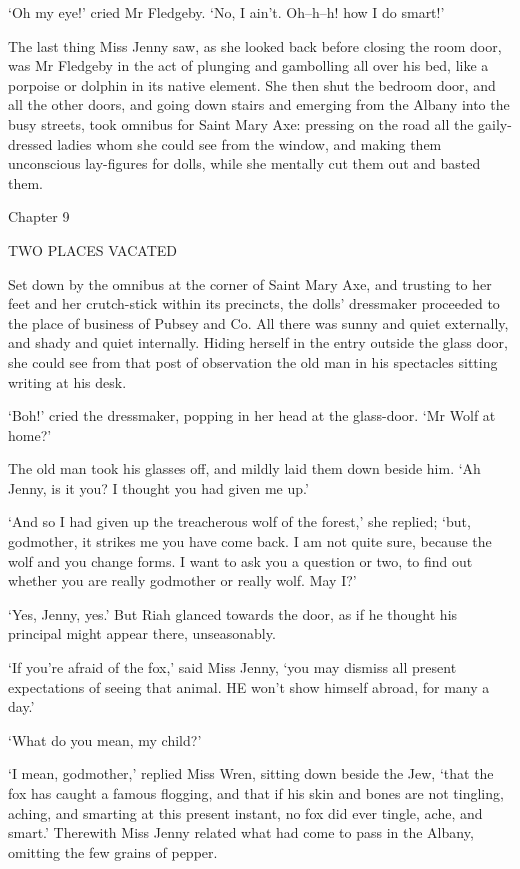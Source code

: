 ‘Oh my eye!’ cried Mr Fledgeby. ‘No, I ain’t. Oh--h--h! how I do smart!’

The last thing Miss Jenny saw, as she looked back before closing the
room door, was Mr Fledgeby in the act of plunging and gambolling all
over his bed, like a porpoise or dolphin in its native element. She then
shut the bedroom door, and all the other doors, and going down stairs
and emerging from the Albany into the busy streets, took omnibus for
Saint Mary Axe: pressing on the road all the gaily-dressed ladies whom
she could see from the window, and making them unconscious lay-figures
for dolls, while she mentally cut them out and basted them.



Chapter 9

TWO PLACES VACATED


Set down by the omnibus at the corner of Saint Mary Axe, and trusting
to her feet and her crutch-stick within its precincts, the dolls’
dressmaker proceeded to the place of business of Pubsey and Co. All
there was sunny and quiet externally, and shady and quiet internally.
Hiding herself in the entry outside the glass door, she could see from
that post of observation the old man in his spectacles sitting writing
at his desk.

‘Boh!’ cried the dressmaker, popping in her head at the glass-door. ‘Mr
Wolf at home?’

The old man took his glasses off, and mildly laid them down beside him.
‘Ah Jenny, is it you? I thought you had given me up.’

‘And so I had given up the treacherous wolf of the forest,’ she replied;
‘but, godmother, it strikes me you have come back. I am not quite sure,
because the wolf and you change forms. I want to ask you a question or
two, to find out whether you are really godmother or really wolf. May
I?’

‘Yes, Jenny, yes.’ But Riah glanced towards the door, as if he thought
his principal might appear there, unseasonably.

‘If you’re afraid of the fox,’ said Miss Jenny, ‘you may dismiss all
present expectations of seeing that animal. HE won’t show himself
abroad, for many a day.’

‘What do you mean, my child?’

‘I mean, godmother,’ replied Miss Wren, sitting down beside the Jew,
‘that the fox has caught a famous flogging, and that if his skin and
bones are not tingling, aching, and smarting at this present instant, no
fox did ever tingle, ache, and smart.’ Therewith Miss Jenny related what
had come to pass in the Albany, omitting the few grains of pepper.

